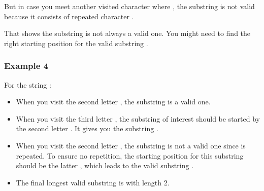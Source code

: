 \documentclass[letterpaper,12pt,english]{book}
\begin{document}
\sphinxAtStartPar
But in case you meet another visited character  where , the substring  is not valid because it consists of repeated character .

\sphinxAtStartPar
That shows the substring  is not always a valid one. You might need to find the right starting position  for the valid substring .


\subsubsection{Example 4}
\label{\detokenize{String/08_STR_3_Longest_Substring_Without_Repeating_Characters:example-4}}
\sphinxAtStartPar
For the string :
\begin{itemize}
\item {} 
\sphinxAtStartPar
When you visit the second letter , the substring  is a valid one.

\item {} 
\sphinxAtStartPar
When you visit the third letter , the substring of interest should be started by the second letter . It gives you the substring .

\item {} 
\sphinxAtStartPar
When you visit the second letter , the substring  is not a valid one since  is repeated. To ensure no repetition, the starting position for this substring should be the latter , which leads to the valid substring .

\item {} 
\sphinxAtStartPar
The final longest valid substring is  with length 2.

\end{itemize}
\end{document}
